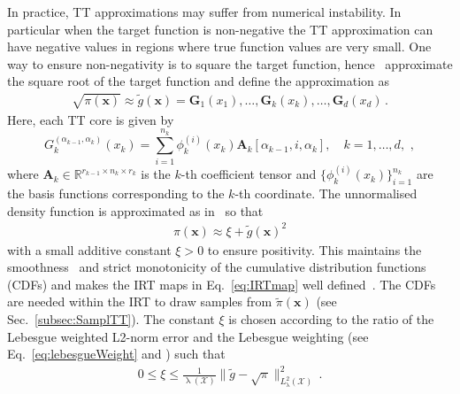 In practice, TT approximations may suffer from numerical instability.
In particular when the target function is non-negative the TT approximation can have negative values in regions where true function values are very small.
One way to ensure non-negativity is to square the target function, hence~\cite{cui2022deep} approximate the square root of the target function and 
define the approximation as \cite[Eq.~18]{cui2022deep}
\begin{align}
	\sqrt{\pi(\bm{x})} \approx \tilde{g}(\bm{x}) = \bm{G}_1(x_1), \dots, \bm{G}_k(x_k), \dots, \bm{G}_d(x_d)\, .
\end{align}
Here, each TT core is given by \cite[Eq.~21]{cui2022deep}
\begin{equation}
	G^{(\alpha_{k-1},\alpha_k)}_k(x_k) = \sum_{i=1}^{n_k} \phi^{(i)}_k(x_k) \bm{A}_k[\alpha_{k-1}, i, \alpha_k], \quad k = 1, \dots, d,\, \,  ,
\end{equation}
where $\bm{A}_k \in \mathbb{R}^{r_{k-1} \times n_k \times r_k}$ is the $k$-th coefficient tensor and $\{\phi^{(i)}_k(x_k)\}_{i=1}^{n_k}$ are the basis functions corresponding to the $k$-th coordinate.
The unnormalised density function is approximated as in~\cite[Eq.~19]{cui2022deep} so that
\begin{align}
	\pi(\bm{x}) \approx \xi + \tilde{g}(\bm{x})^2 
\end{align}
with a small additive constant $\xi > 0$ to ensure positivity.
This maintains the smoothness~\cite{cui2022deep} and strict monotonicity of the cumulative distribution functions (CDFs) and makes the IRT maps in Eq.~\ref{eq:IRTmap} well defined~\cite{foxRosen21}.
The CDFs are needed within the IRT to draw samples from $\tilde{\pi}(\bm{x})$ (see Sec.~\ref{subsec:SamplTT}).
The constant $\xi$ is chosen according to the ratio of the Lebesgue weighted L2-norm error and the Lebesgue weighting (see Eq.~\ref{eq:lebesgueWeight} and \cite[Eq.~35]{cui2022deep}) such that 
\begin{align}
	0 \leq \xi \leq \frac{1}{\uplambda(\mathcal{X})} \lVert \tilde{g} - \sqrt{\pi} \rVert_{L^2_{\uplambda}(\mathcal{X})}^2\,  \label{eq:gamErr}.
\end{align}

